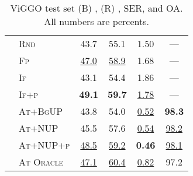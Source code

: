 \begin{table}[p]
\begin{minipage}[t]{0.45\linewidth}
{\begin{tabular}{ll cccc}
 & \textsc{Rnd}  & 43.7 & 55.1 & 1.50 & --- \\
 & \textsc{Fp}  & \uline{47.0} & \uline{58.9} & 1.68 & --- \\
 & \textsc{If}  & 43.1 & 54.4 & 1.86 & --- \\
 & \textsc{If\small{+p}}  & \textbf{49.1} & \textbf{59.7} & \uline{1.78} & --- \\
 & \textsc{At\small{+BgUP}}  & 43.8 & 54.0 & \uline{0.52} & \textbf{98.3} \\
 & \textsc{At\small{+NUP}}  & 45.5 & 57.6 & \uline{0.54} & \uline{98.2} \\
 & \textsc{At\small{+NUP+p}}  & \uline{48.5} & \uline{59.2} & \textbf{0.46} & \uline{98.1} \\
 & \textsc{At \small{Oracle}}  & \uline{47.1} & \uline{60.4} & \uline{0.82} & 97.2 \\
\bottomrule
\end{tabular}}
\caption{ViGGO test set (B) \bleu, (R) \rougel, SER, and OA. All numbers are percents. }
\label{tab:main.viggo.test}
\end{minipage}
\end{table}
